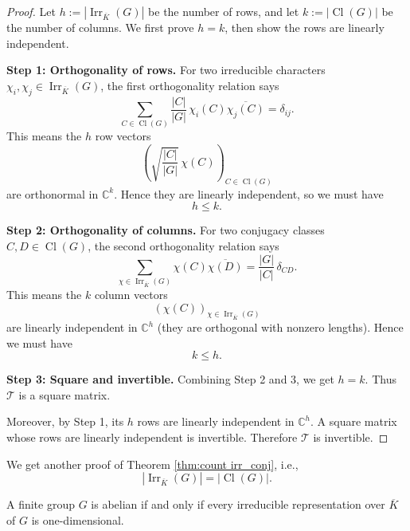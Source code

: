\begin{proof}
Let \(h := |\operatorname{Irr}_{\overline{K}}(G)|\) be the number of rows, and let \(k := |\operatorname{Cl}(G)|\) be the number of columns. We first prove \(h = k\), then show the rows are linearly independent.

\medskip
\noindent\textbf{Step 1: Orthogonality of rows.}  
For two irreducible characters \(\chi_i, \chi_j \in \operatorname{Irr}_{\overline{K}}(G)\), the first orthogonality relation says
\[
\sum_{C \in \operatorname{Cl}(G)} \frac{|C|}{|G|} \, \chi_i(C) \overline{\chi_j(C)} = \delta_{ij}.
\]
This means the \(h\) row vectors
\[
\left( \sqrt{\frac{|C|}{|G|}} \, \chi(C) \right)_{C \in \operatorname{Cl}(G)}
\]
are orthonormal in \(\mathbb C^k\). Hence they are linearly independent, so we must have
\[
h \le k. 
\]

\medskip
\noindent\textbf{Step 2: Orthogonality of columns.}  
For two conjugacy classes \(C, D \in \operatorname{Cl}(G)\), the second orthogonality relation says
\[
\sum_{\chi \in \operatorname{Irr}_{\overline{K}}(G)} \chi(C) \overline{\chi(D)}
=
\frac{|G|}{|C|} \, \delta_{CD}.
\]
This means the \(k\) column vectors
\[
\left( \chi(C) \right)_{\chi \in \operatorname{Irr}_{\overline{K}}(G)}
\]
are linearly independent in \(\mathbb C^h\) (they are orthogonal with nonzero lengths). Hence we must have
\[
k \le h. 
\]

\medskip
\noindent\textbf{Step 3: Square and invertible.}  
Combining Step 2 and 3, we get \(h = k\). Thus \(\mathcal T\) is a square matrix.

Moreover, by Step 1, its \(h\) rows are linearly independent in \(\mathbb C^h\). A square matrix whose rows are linearly independent is invertible. Therefore \(\mathcal T\) is invertible.
\end{proof}

\begin{cor}
\label{cor:orbit_count}

We get another proof of Theorem \ref{thm:count irr_conj}, i.e., 
\[|\operatorname{Irr}_{\overline{K}}(G)|=|\operatorname{Cl}(G)|.\]
\end{cor}


\begin{lemma}
\label{lem:serre_9}
A finite group \(G\) is abelian if and only if every irreducible representation over $\overline{K}$ of \(G\) is one-dimensional.
\end{lemma}

